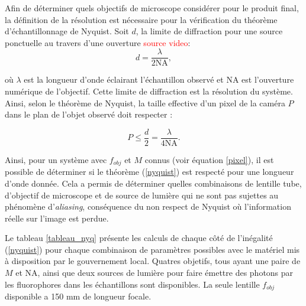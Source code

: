 \documentclass[conference]{IEEEtran}
\begin{document}
Afin de déterminer quels objectifs de microscope considérer pour le produit final, la définition
de la résolution est nécessaire pour la vérification du théorème d'échantillonnage de Nyquist. Soit $d$,
la limite de diffraction pour une source ponctuelle au travers d'une ouverture \textcolor{red}{source video}:
\begin{equation}
  d = \frac{\lambda}{2 \text{NA}},
\end{equation}

où $\lambda$ est la longueur d'onde éclairant l'échantillon observé et NA est l'ouverture numérique de
l'objectif. Cette limite de diffraction est la résolution du système. Ainsi, selon le théorème
de Nyquist, la taille effective d'un pixel de la caméra $P$ dans le plan de l'objet observé doit respecter :

\begin{equation}\label{nyquist}
  P \leq \frac{d}{2} = \frac{\lambda}{4 \text{NA} }.
\end{equation}


Ainsi, pour un système avec $f_{obj}$ et $M$ connus (voir équation \ref{pixel}), il est possible de déterminer si le théorème 
(\ref{nyquist}) est respecté pour une longueur d'onde donnée. Cela a permis de déterminer quelles 
combinaisons de lentille tube, d'objectif de microscope et de source de lumière qui ne sont pas 
sujettes au phénomène d'\textit{aliasing}, conséquence du non respect de Nyquist où l'information
réelle sur l'image est perdue.


Le tableau \ref{tableau_nyq} présente les calculs de chaque côté de l'inégalité (\ref{nyquist}) pour
chaque combinaison de paramètres possibles avec le matériel mis à disposition par le gouvernement local.
Quatres objetifs, tous ayant une paire de $M$ et NA, ainsi que deux sources de lumière pour faire émettre
des photons par les fluorophores dans les échantillons sont disponibles. La seule lentille $f_{obj}$ disponible a 150 mm de longueur focale.
\end{document}
